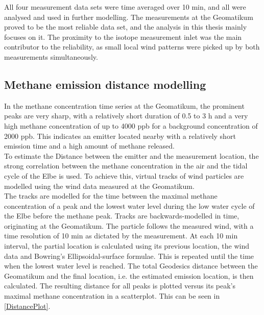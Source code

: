 All four measurement data sets were time averaged over 10 min, and all were analysed and used in further modelling. The measurements at the Geomatikum proved to be the most reliable data set, and the analysis in this thesis mainly focuses on it. The proximity to the isotope measurement inlet was the main contributor to the reliability, as small local wind patterns were picked up by both measurements simultaneously. 

\subsection{Methane emission distance modelling}
In the methane concentration time series at the Geomatikum, the prominent peaks are very sharp, with a relatively short duration of 0.5 to 3 h and a very high methane concentration of up to 4000 ppb for a background concentration of 2000 ppb. This indicates an emitter located nearby with a relatively short emission time and a high amount of methane released. \\
To estimate the Distance between the emitter and the measurement location,
the strong correlation between the methane concentration in the air and the tidal cycle of the Elbe is used.
To achieve this, virtual tracks of wind particles are modelled using the wind data measured at the Geomatikum. \\
The tracks are modelled for the time between the maximal methane concentration of a peak and the lowest water level during the low water cycle of the Elbe before the methane peak. Tracks are backwards-modelled in time, originating at the Geomatikum. The particle follows the measured wind, with a time resolution of 10 min as dictated by the measurement. At each 10 min interval, the partial location is calculated using its previous location, the wind data and Bowring's Ellipsoidal-surface formulae.  This is repeated until the time when the lowest water level is reached. The total 
Geodesics distance between the Geomatikum and the final location, i.e. the estimated emission location, is then calculated. The resulting distance for all peaks is plotted versus its peak's maximal methane concentration in a scatterplot. This can be seen in \cref{DistancePlot}.


